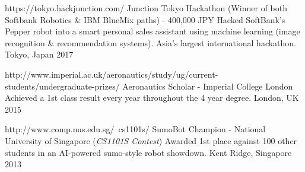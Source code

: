 

\begin{cvhonors}

  \cvhonor
  	{https://tokyo.hackjunction.com/}
    {Junction Tokyo Hackathon (Winner of both Softbank Robotics \& IBM BlueMix paths) - 400,000 JPY} %
    {Hacked SoftBank's Pepper robot into a smart personal sales assistant using machine learning (image recognition \& recommendation systems). Asia's largest international hackathon.} %
    {Tokyo, Japan} %
    {2017} %


  \cvhonor
  	{http://www.imperial.ac.uk/aeronautics/study/ug/current-students/undergraduate-prizes/}
    {Aeronautics Scholar - Imperial College London} %
    {Achieved a 1st class result every year throughout the 4 year degree.} %
    {London, UK} %
    {2015} %

  \cvhonor
  	{http://www.comp.nus.edu.sg/~cs1101s/}
    {SumoBot Champion - National University of Singapore (\emph{CS1101S Contest})} %
    {Awarded 1st place against 100 other students in an AI-powered sumo-style robot showdown.} %
    {Kent Ridge, Singapore} %
    {2013} %


\end{cvhonors}

